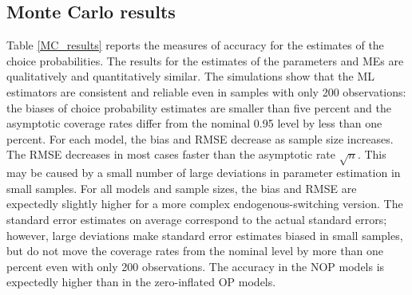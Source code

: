 \documentclass[letterpaper,fleqn,12pt]{article}
\begin{document}
\subsection{Monte Carlo results}

Table \ref{MC_results} reports the measures of accuracy for the estimates of
the choice probabilities. The results for the estimates of the parameters
and MEs are qualitatively and quantitatively similar. The simulations show
that the ML estimators are consistent and reliable even in samples with only
200 observations: the biases of choice probability estimates are smaller
than five percent and the asymptotic coverage rates differ from the nominal
0.95 level by less than one percent. For each model, the bias and RMSE
decrease as sample size increases. The RMSE decreases in most cases faster
than the asymptotic rate $\sqrt{n}$. This may be caused by a small number of
large deviations in parameter estimation in small samples. For all models
and sample sizes, the bias and RMSE are expectedly slightly higher for a
more complex endogenous-switching version. The standard error estimates on
average correspond to the actual standard errors; however, large deviations
make standard error estimates biased in small samples, but do not move the
coverage rates from the nominal level by more than one percent even with
only 200 observations. The accuracy in the NOP models is expectedly higher
than in the zero-inflated OP models.

\medskip
\end{document}

